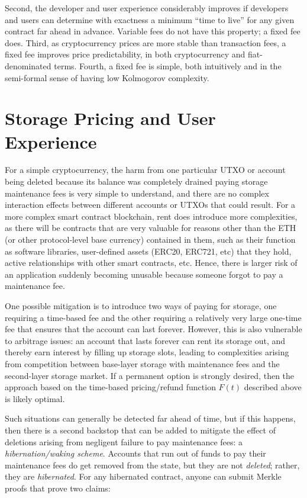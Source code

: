 \documentclass[12pt, final]{article}
\begin{document}
Second, the developer and user experience considerably improves if developers and users can determine with exactness a minimum ``time to live'' for any given contract far ahead in advance. Variable fees do not have this property; a fixed fee does. Third, as cryptocurrency prices are more stable than transaction fees, a fixed fee improves price predictability, in both cryptocurrency and fiat-denominated terms. Fourth, a fixed fee is simple, both intuitively and in the semi-formal sense of having low Kolmogorov complexity.

\section{Storage Pricing and User Experience}

For a simple cryptocurrency, the harm from one particular UTXO or account being deleted because its balance was completely drained paying storage maintenance fees is very simple to understand, and there are no complex interaction effects between different accounts or UTXOs that could result. For a more complex smart contract blockchain, rent does introduce more complexities, as there will be contracts that are very valuable for reasons other than the ETH (or other protocol-level base currency) contained in them, such as their function as software libraries, user-defined assets (ERC20, ERC721, etc) that they hold, active relationships with other smart contracts, etc. Hence, there is larger risk of an application suddenly becoming unusable because someone forgot to pay a maintenance fee. 

One possible mitigation is to introduce two ways of paying for storage, one requiring a time-based fee and the other requiring a relatively very large one-time fee that ensures that the account can last forever. However, this is also vulnerable to arbitrage issues: an account that lasts forever can rent its storage out, and thereby earn interest by filling up storage slots, leading to complexities arising from competition between base-layer storage with maintenance fees and the second-layer storage market. If a permanent option is strongly desired, then the approach based on the time-based pricing/refund function $F(t)$ described above is likely optimal.

Such situations can generally be detected far ahead of time, but if this happens, then there is a second backstop that can be added to mitigate the effect of deletions arising from negligent failure to pay maintenance fees: a \emph{hibernation/waking scheme}. Accounts that run out of funds to pay their maintenance fees do get removed from the state, but they are not \emph{deleted}; rather, they are \emph{hibernated}. For any hibernated contract, anyone can submit Merkle proofs that prove two claims:
\end{document}
